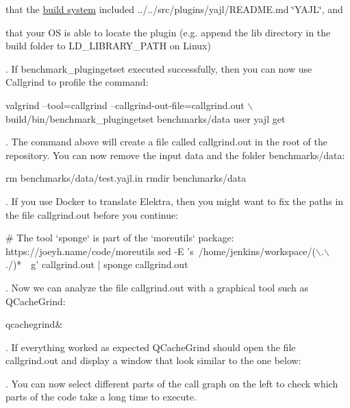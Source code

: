 \begin{DoxyItemize}
\item that the \hyperlink{doc_COMPILE_md}{build system} included ../../src/plugins/yajl/\+R\+E\+A\+D\+ME.md \char`\"{}\+Y\+A\+J\+L\char`\"{}, and
\item that your OS is able to locate the plugin (e.\+g. append the {\ttfamily lib} directory in the build folder to {\ttfamily L\+D\+\_\+\+L\+I\+B\+R\+A\+R\+Y\+\_\+\+P\+A\+TH} on Linux)
\end{DoxyItemize}

. If {\ttfamily benchmark\+\_\+plugingetset} executed successfully, then you can now use Callgrind to profile the command\+:


\begin{DoxyCode}
valgrind --tool=callgrind --callgrind-out-file=callgrind.out \(\backslash\)
build/bin/benchmark\_plugingetset benchmarks/data user yajl get
\end{DoxyCode}


. The command above will create a file called {\ttfamily callgrind.\+out} in the root of the repository. You can now remove the input data and the folder {\ttfamily benchmarks/data}\+:


\begin{DoxyCode}
rm benchmarks/data/test.yajl.in
rmdir benchmarks/data
\end{DoxyCode}


. If you use Docker to translate Elektra, then you might want to fix the paths in the file {\ttfamily callgrind.\+out} before you continue\+:


\begin{DoxyCode}
# The tool `sponge` is part of the `moreutils` package: https://joeyh.name/code/moreutils
sed -E 's~/home/jenkins/workspace/(\(\backslash\).\(\backslash\)./)*~~g' callgrind.out | sponge callgrind.out
\end{DoxyCode}


. Now we can analyze the file {\ttfamily callgrind.\+out} with a graphical tool such as Q\+Cache\+Grind\+:


\begin{DoxyCode}
qcachegrind&
\end{DoxyCode}


. If everything worked as expected Q\+Cache\+Grind should open the file {\ttfamily callgrind.\+out} and display a window that look similar to the one below\+:



. You can now select different parts of the call graph on the left to check which parts of the code take a long time to execute.

